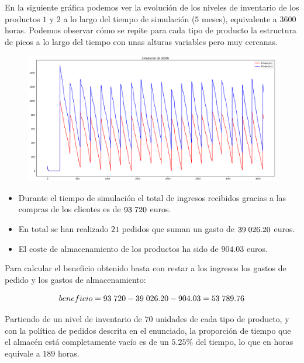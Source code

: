 \documentclass[a4paper,12pt]{article}
\begin{document}
	En la siguiente gráfica podemos ver la evolución de los niveles de inventario de los productos $1$
y $2$ a lo largo del tiempo de simulación ($5$ meses), equivalente a $3600$ horas. Podemos
observar cómo se repite para cada tipo de producto la estructura de picos a lo largo del tiempo
con unas alturas variables pero muy cercanas.
	\begin{figure}[H]
		\centering
		\includegraphics[width=\textwidth]{include/simulacion_5m_ancha.png}
	\end{figure}

	\begin{itemize}
		\item Durante el tiempo de simulación el total de ingresos recibidos gracias a las compras de
	los clientes es de $93\hspace{1mm}720$ euros.

		\item En total se han realizado $21$ pedidos que suman un gasto de $39\hspace{1mm}026.20$ euros.

		\item El coste de almacenamiento de los productos ha sido de $904.03$ euros.
	\end{itemize}

	Para calcular el beneficio obtenido basta con restar a los ingresos los gastos de pedido y los gastos
de almacenamiento:

	$$beneficio = 93\hspace{1mm}720 - 39\hspace{1mm}026.20 - 904.03 = 53\hspace{1mm}789.76$$
	
	
	Partiendo de un nivel de inventario de $70$ unidades de cada tipo de producto, y con la política de
pedidos descrita en el enunciado, la proporción de tiempo que el almacén está completamente
vacío es de un $5.25\%$ del tiempo, lo que en horas equivale a $189$ horas.
\end{document}
